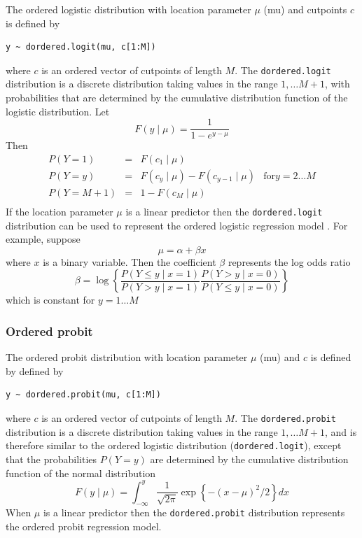 \documentclass[11pt, a4paper, titlepage]{report}
\begin{document}
{The ordered logistic distribution with location parameter $\mu$ (mu)
and cutpoints $c$ is defined by
\begin{verbatim}
y ~ dordered.logit(mu, c[1:M])
\end{verbatim}
where $c$ is an ordered vector of cutpoints of length $M$. The
\texttt{dordered.logit} distribution is a discrete distribution
taking values in the range $1, \ldots M+1$, with probabilities
that are determined by the cumulative distribution function
of the logistic distribution. Let
\[
F(y \mid \mu) = \frac{1}{1 - e^{y-\mu}}
\]
Then
\[
\begin{array}{lcll}
  P(Y = 1) & = & F(c_1 \mid \mu) & \\
  P(Y = y) & = & F(c_{y} \mid \mu) - F(c_{y-1} \mid \mu) & \text{for} y=2 \ldots M \\
  P(Y = M+1) & = & 1 - F(c_M \mid \mu) & \\
\end{array}
\]
If the location parameter $\mu$ is a linear predictor then the
\texttt{dordered.logit} distribution can be used to represent the
ordered logistic regression model \citep{McCullagh1980}. For example,
suppose
\[
\mu = \alpha + \beta x
\]
where $x$ is a binary variable. Then the coefficient $\beta$
represents the log odds ratio
\[
\beta = \log
\left\{
\frac{P\left(Y \leq y \mid x=1\right)}{P\left(Y > y \mid x=1\right)}
\frac{P\left(Y > y \mid x=0\right)}{P\left(Y \leq y \mid x=0\right)}
\right\}
\]
which is constant for $y = 1 \ldots M$
     

\subsubsection{Ordered probit}

The ordered probit distribution with location parameter $\mu$ (mu)
and $c$ is defined by
defined by
\begin{verbatim}
y ~ dordered.probit(mu, c[1:M])
\end{verbatim}
where $c$ is an ordered vector of cutpoints of length $M$. The
\texttt{dordered.probit} distribution is a discrete distribution taking
values in the range $1, \ldots M+1$, and is therefore similar to the ordered
logistic distribution (\texttt{dordered.logit}), except that
the probabilities $P(Y=y)$ are determined by the cumulative
distribution function of the normal distribution
\[
F(y \mid \mu) = \int_{-\infty}^y \frac{1}{\sqrt{2\pi}}
\exp\left\{ -(x - \mu)^2 /2 \right\} dx
\]
When $\mu$ is a linear predictor then the \texttt{dordered.probit}
distribution represents the ordered probit regression model.

}
\end{document}
